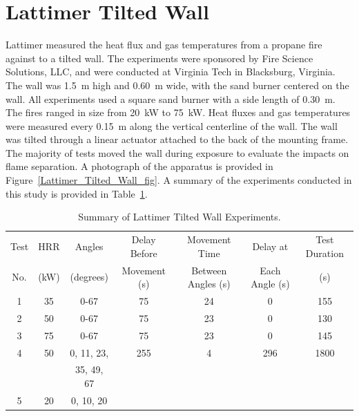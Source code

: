 \section{Lattimer Tilted Wall}
\label{Lattimer_Tilted_Wall_Description}

Lattimer measured the heat flux and gas temperatures from a propane fire against to a tilted wall. The experiments were sponsored by Fire Science Solutions, LLC, and were conducted at Virginia Tech in Blacksburg, Virginia. The wall was 1.5~m high and 0.60~m wide, with the sand burner centered on the wall. All experiments used a square sand burner with a side length of 0.30~m. The fires ranged in size from 20~kW to 75~kW. Heat fluxes and gas temperatures were measured every 0.15~m along the vertical centerline of the wall. The wall was tilted through a linear actuator attached to the back of the mounting frame. The majority of tests moved the wall during exposure to evaluate the impacts on flame separation. A photograph of the apparatus is provided in Figure~\ref{Lattimer_Tilted_Wall_fig}. A summary of the experiments conducted in this study is provided in Table~\ref{tab:lattimer_tilted_wall_exp}.

\begin{table}[!ht]
\centering
\caption[Summary of Lattimer Tilted Wall Experiments]{Summary of Lattimer Tilted Wall Experiments.}
\label{tab:lattimer_tilted_wall_exp}
\begin{tabular}{|c|c|c|c|c|c|c|}
\hline
Test & HRR  & Angles    & Delay Before & Movement Time      & Delay at         & Test Duration \\
No.  & (kW) & (degrees) & Movement (s) & Between Angles (s) & Each Angle (s)   & (s)           \\ \hline \hline
1    & 35   & 0-67      & 75                    & 24                           & 0                   & 155           \\ \hline
2    & 50   & 0-67      & 75                    & 23                           & 0                   & 130           \\ \hline
3    & 75   & 0-67      & 75                    & 23                           & 0                   & 145           \\ \hline
4    & 50   & 0, 11, 23,  & 255                 & 4                            & 296                 & 1800          \\
     &      & 35, 49, 67  &                     &                              &                     &               \\ \hline
5    & 20   & 0, 10, 20 &                       &                              &                     &               \\ \hline
\end{tabular}
\end{table}

